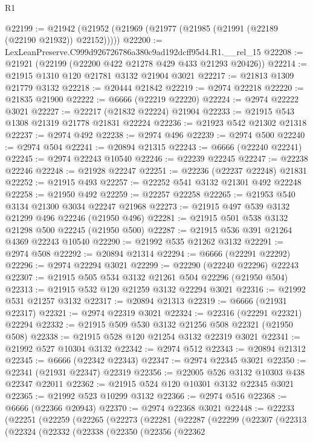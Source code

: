 \begin{lexlean}{R1}
\begin{coremodule}
@22199 := @21942 (@21952 (@21969 (@21977 (@21985 (@21991 (@22189 (@22190 @21932)) @22152)))))
@22200 := LexLeanPreserve.C999d926726786a380c9ad192dcff95d4.R1.__rel_15
@22208 := @21921 (@22199 (@22200 @422 @21278 @429 @433 @21293 @20426))
@22214 := @21915 @1310 @120 @21781 @3132 @21904 @3021
@22217 := @21813 @1309 @21779 @3132
@22218 := @20444 @21842
@22219 := @2974 @22218
@22220 := @21835 @21900
@22222 := @6666 (@22219 @22220)
@22224 := @2974 @22222 @3021
@22227 := @22217 (@21832 @22224) @21904
@22233 := @21915 @543 @1308 @21319 @21778 @21831 @22224
@22236 := @21923 @542 @21302 @21318
@22237 := @2974 @492
@22238 := @2974 @496
@22239 := @2974 @500
@22240 := @2974 @504
@22241 := @20894 @21315
@22243 := @6666 (@22240 @22241)
@22245 := @2974 @22243 @10540
@22246 := @22239 @22245
@22247 := @22238 @22246
@22248 := @21928 @22247
@22251 := @22236 (@22237 @22248) @21831
@22252 := @21915 @493
@22257 := @22252 @541 @3132 @21301 @492 @22248
@22258 := @21950 @492
@22259 := @22257 @22258
@22265 := @21953 @540 @3134 @21300 @3034 @22247 @21968
@22273 := @21915 @497 @539 @3132 @21299 @496 @22246 (@21950 @496)
@22281 := @21915 @501 @538 @3132 @21298 @500 @22245 (@21950 @500)
@22287 := @21915 @536 @391 @21264 @4369 @22243 @10540
@22290 := @21992 @535 @21262 @3132
@22291 := @2974 @508
@22292 := @20894 @21314
@22294 := @6666 (@22291 @22292)
@22296 := @2974 @22294 @3021
@22299 := @22290 (@22240 @22296) @22243
@22307 := @21915 @505 @534 @3132 @21261 @504 @22296 (@21950 @504)
@22313 := @21915 @532 @120 @21259 @3132 @22294 @3021
@22316 := @21992 @531 @21257 @3132
@22317 := @20894 @21313
@22319 := @6666 (@21931 @22317)
@22321 := @2974 @22319 @3021
@22324 := @22316 (@22291 @22321) @22294
@22332 := @21915 @509 @530 @3132 @21256 @508 @22321 (@21950 @508)
@22338 := @21915 @528 @120 @21254 @3132 @22319 @3021
@22341 := @21992 @527 @10304 @3132
@22342 := @2974 @512
@22343 := @20894 @21312
@22345 := @6666 (@22342 @22343)
@22347 := @2974 @22345 @3021
@22350 := @22341 (@21931 @22347) @22319
@22356 := @22005 @526 @3132 @10303 @438 @22347 @22011
@22362 := @21915 @524 @120 @10301 @3132 @22345 @3021
@22365 := @21992 @523 @10299 @3132
@22366 := @2974 @516
@22368 := @6666 (@22366 @20943)
@22370 := @2974 @22368 @3021
@22448 := @22233
    (@22251
      (@22259
        (@22265
          (@22273
            (@22281
              (@22287
                (@22299
                  (@22307
                    (@22313
                      (@22324
                        (@22332
                          (@22338
                            (@22350
                              (@22356
                                (@22362

\end{coremodule}
\end{lexlean}
